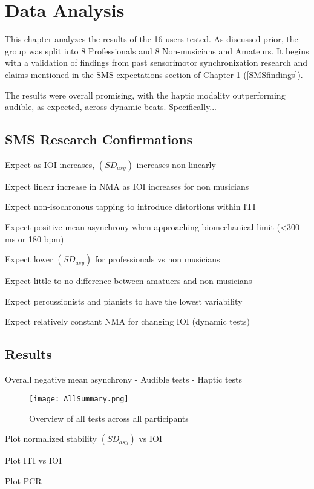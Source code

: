 \chapter{Data Analysis} \label{DataAnalysis}
This chapter analyzes the results of the 16 users tested. As discussed prior, the group was split into 8 Professionals and 8 Non-musicians and Amateurs. It begins with a validation of findings from past sensorimotor synchronization research and claims mentioned in the SMS expectations section of Chapter 1 (\ref{SMSfindings}).

The results were overall promising, with the haptic modality outperforming audible, as expected, across dynamic beats. Specifically...

\section{SMS Research Confirmations}
Expect as IOI increases, $(SD_{asy})$ increases non linearly

Expect linear increase in NMA as IOI increases for non musicians

Expect non-isochronous tapping to introduce distortions within ITI

Expect positive mean asynchrony when approaching biomechanical limit (<300 ms or 180 bpm)

Expect lower $(SD_{asy})$ for professionals vs non musicians

Expect little to no difference between amatuers and non musicians

Expect percussionists and pianists to have the lowest variability

Expect relatively constant NMA for changing IOI (dynamic tests)


\section{Results}
Overall negative mean asynchrony
- Audible tests
- Haptic tests

\begin{figure}[H]
    \centering
    \texttt{[image: AllSummary.png]}
    \caption{Overview of all tests across all participants}
    \label{fig:AllSummary}
\end{figure}

Plot normalized stability $(SD_{asy})$ vs IOI

Plot ITI vs IOI

Plot PCR
